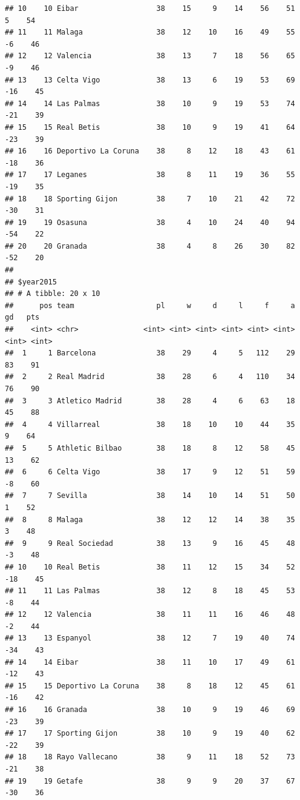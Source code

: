 \documentclass[]{tufte-handout}
\begin{document}
\begin{verbatim}
## 10    10 Eibar                  38    15     9    14    56    51     5    54
## 11    11 Malaga                 38    12    10    16    49    55    -6    46
## 12    12 Valencia               38    13     7    18    56    65    -9    46
## 13    13 Celta Vigo             38    13     6    19    53    69   -16    45
## 14    14 Las Palmas             38    10     9    19    53    74   -21    39
## 15    15 Real Betis             38    10     9    19    41    64   -23    39
## 16    16 Deportivo La Coruna    38     8    12    18    43    61   -18    36
## 17    17 Leganes                38     8    11    19    36    55   -19    35
## 18    18 Sporting Gijon         38     7    10    21    42    72   -30    31
## 19    19 Osasuna                38     4    10    24    40    94   -54    22
## 20    20 Granada                38     4     8    26    30    82   -52    20
## 
## $year2015
## # A tibble: 20 x 10
##      pos team                   pl     w     d     l     f     a    gd   pts
##    <int> <chr>               <int> <int> <int> <int> <int> <int> <int> <int>
##  1     1 Barcelona              38    29     4     5   112    29    83    91
##  2     2 Real Madrid            38    28     6     4   110    34    76    90
##  3     3 Atletico Madrid        38    28     4     6    63    18    45    88
##  4     4 Villarreal             38    18    10    10    44    35     9    64
##  5     5 Athletic Bilbao        38    18     8    12    58    45    13    62
##  6     6 Celta Vigo             38    17     9    12    51    59    -8    60
##  7     7 Sevilla                38    14    10    14    51    50     1    52
##  8     8 Malaga                 38    12    12    14    38    35     3    48
##  9     9 Real Sociedad          38    13     9    16    45    48    -3    48
## 10    10 Real Betis             38    11    12    15    34    52   -18    45
## 11    11 Las Palmas             38    12     8    18    45    53    -8    44
## 12    12 Valencia               38    11    11    16    46    48    -2    44
## 13    13 Espanyol               38    12     7    19    40    74   -34    43
## 14    14 Eibar                  38    11    10    17    49    61   -12    43
## 15    15 Deportivo La Coruna    38     8    18    12    45    61   -16    42
## 16    16 Granada                38    10     9    19    46    69   -23    39
## 17    17 Sporting Gijon         38    10     9    19    40    62   -22    39
## 18    18 Rayo Vallecano         38     9    11    18    52    73   -21    38
## 19    19 Getafe                 38     9     9    20    37    67   -30    36

\end{verbatim}
\end{document}
